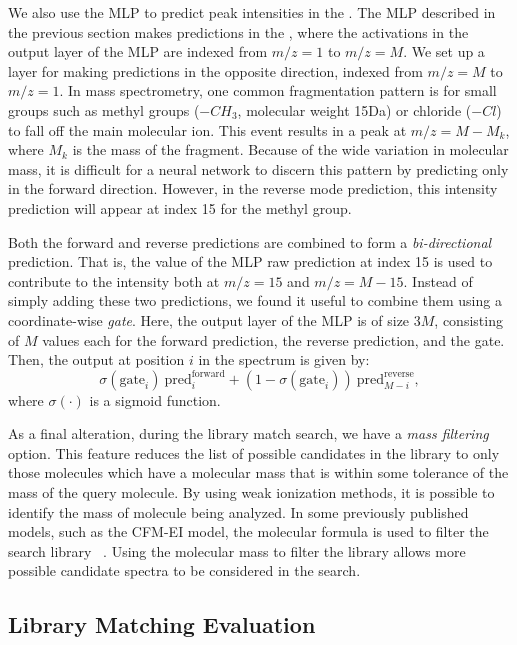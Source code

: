\documentclass{article}
\begin{document}
We also use the MLP to predict peak intensities in the .  The MLP described in the previous section makes predictions in the , where the activations in the output layer of the MLP are indexed from $m/z = 1$ to $m/z = M$. We set up a layer for making predictions in the opposite direction, indexed from $m/z = M$ to $m/z = 1$. In mass spectrometry, one common fragmentation pattern is for small groups such as methyl groups ($-CH_3$, molecular weight 15Da) or chloride ($-Cl$) to fall off the main molecular ion. This event results in a peak at $m/z = M - M_k$, where $M_k$ is the mass of the fragment. Because of the wide variation in molecular mass, it is difficult for a neural network to discern this pattern by predicting only in the forward direction. However, in the reverse mode prediction, this intensity prediction will appear at index 15 for the methyl group.

Both the forward and reverse predictions are  combined to form a \textit{bi-directional} prediction. That is, the value of the MLP raw prediction at index 15 is used to contribute to the intensity both at $m/z = 15$ and $m/z = M - 15$. Instead of simply adding these two predictions, we found it useful to combine them using a coordinate-wise \textit{gate}. Here, the output layer of the MLP is of size $3M$, consisting of $M$ values each for the forward prediction, the reverse prediction, and the gate. Then, the output at position $i$ in the spectrum is given by:
\begin{equation}\label{eq:sigmoid_gate}
\sigma(\text{gate}_i) ~ \text{pred}^\text{forward}_i + (1 - \sigma(\text{gate}_i)) ~ \text{pred}^\text{reverse}_{M - i},
\end{equation}
where $\sigma(\cdot)$ is a sigmoid function.

As a final alteration, during the library match search, we have a \textit{mass filtering} option. This feature reduces the list of possible candidates in the library to only those molecules which have a molecular mass that is within some tolerance of the mass of the query molecule.
By using weak ionization methods, it is possible to identify the mass of molecule being analyzed. In some previously published models, such as the CFM-EI model, the molecular formula is used to filter the search library
~\cite{allen2016computational}. Using the molecular mass to filter the library allows more possible candidate spectra to be considered in the search.

\subsection{Library Matching Evaluation}\label{sec:library_matching_description}
\end{document}
